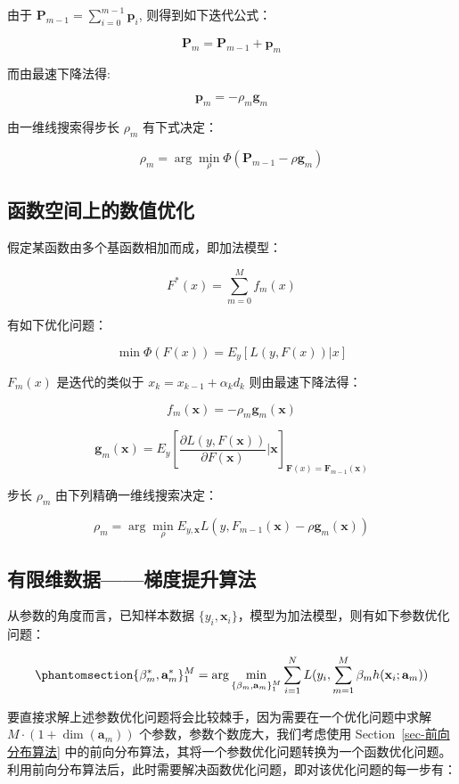 \documentclass[
  letterpaper,
  DIV=11,
  numbers=noendperiod]{scrartcl}
\begin{document}
由于 \(\mathbf P_{m-1}=\sum_{i=0}^{m-1}\mathbf p_i\),
则得到如下迭代公式：

\[
\mathbf P_m=\mathbf P_{m-1}+\mathbf p_m
\]

而由最速下降法得:

\[
\mathbf p_m=-\rho_m\mathbf g_m
\]

由一维线搜索得步长 \(\rho_m\) 有下式决定：

\[
\rho_m=\arg\min_\rho\Phi(\mathbf P_{m-1}-\rho\mathbf g_m)
\]

\subsection{函数空间上的数值优化}\label{ux51fdux6570ux7a7aux95f4ux4e0aux7684ux6570ux503cux4f18ux5316}

假定某函数由多个基函数相加而成，即加法模型：

\[
F^*(x)=\sum_{m=0}^Mf_m(x)
\]

有如下优化问题：

\[
\min\Phi(F(x))=E_y[L(y,F(x))|x]
\]

\(F_m(x)\) 是迭代的类似于 \(x_k=x_{k-1}+\alpha_kd_k\) 则由最速下降法得：

\[
f_m(\mathbf x)=-\rho_m\mathbf g_m(\mathbf x)
\]

\[
\mathbf g_m(\mathbf x)=E_y[\frac{\partial L(y,F(\mathbf x))}{\partial F(\mathbf x)}|\mathbf x]_{\mathbf F(x)=\mathbf F_{m-1}(\mathbf x)}
\]

步长 \(\rho_m\) 由下列精确一维线搜索决定：

\[
\rho_m = \arg\min_\rho E_{y,\mathbf x}L(y,F_{m-1}(\mathbf x)-\rho\mathbf g_m(\mathbf x))
\]

\subsection{有限维数据------梯度提升算法}\label{ux6709ux9650ux7ef4ux6570ux636eux68afux5ea6ux63d0ux5347ux7b97ux6cd5}

从参数的角度而言，已知样本数据
\(\{y_i,\mathbf x_i\}\)，模型为加法模型，则有如下参数优化问题：

\begin{equation}\phantomsection\label{eq-ux53c2ux6570ux4f18ux5316ux9650ux5236ux6761ux4ef6}{
\{\beta_m^*,\mathbf a_m^*\}_1^M=\arg\min_{\{\beta_m,\mathbf a_m\}_1^M}\sum_{i=1}^NL(y_i,\sum_{m=1}^M\beta_mh(\mathbf x_i;\mathbf a_m))
}\end{equation}

要直接求解上述参数优化问题将会比较棘手，因为需要在一个优化问题中求解
\(M\cdot(1+\dim (\mathbf a_m))\) 个参数，参数个数庞大，我们考虑使用
Section~\ref{sec-前向分布算法}
中的前向分布算法，其将一个参数优化问题转换为一个函数优化问题。
利用前向分布算法后，此时需要解决函数优化问题，即对该优化问题的每一步有：
\end{document}
